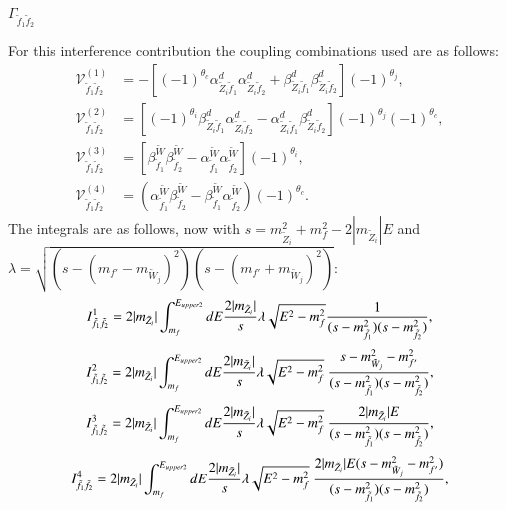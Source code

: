 \documentclass[final,3p,times,pdflatex]{elsarticle}
\begin{document}
\textbf{\underline{$\Gamma_{\tilde{f}_1 \tilde{f}_2}$}}

For this interference contribution the coupling combinations used are as follows:
\begin{align}
\mathcal{V}_{\tilde{f}_1 \tilde{f}_2}^{(1)} &= -[(-1)^{\theta_c}\alpha_{\tilde{Z}_i \tilde{f}_1}^{d}\alpha_{\tilde{Z}_i \tilde{f}_2}^{d} + \beta_{\tilde{Z}_i \tilde{f}_1}^{d} \beta_{\tilde{Z}_i \tilde{f}_2}^{d}](-1)^{\theta_j}, \\
\mathcal{V}_{\tilde{f}_1 \tilde{f}_2}^{(2)} &= [(-1)^{\theta_i}\beta_{\tilde{Z}_i \tilde{f}_1}^{d} \alpha_{\tilde{Z}_i \tilde{f}_2}^{d} - \alpha_{\tilde{Z}_i \tilde{f}_1}^{d} \beta_{\tilde{Z}_i \tilde{f}_2}^{d}](-1)^{\theta_j}(-1)^{\theta_c}, \\
\mathcal{V}_{\tilde{f}_1 \tilde{f}_2}^{(3)} &= [\beta_{\tilde{f}_1}^{\tilde{W}} \beta_{\tilde{f}_2}^{\tilde{W}} - \alpha_{\tilde{f}_1}^{\tilde{W}} \alpha_{\tilde{f}_2}^{\tilde{W}}](-1)^{\theta_i}, \\
\mathcal{V}_{\tilde{f}_1 \tilde{f}_2}^{(4)} &= (\alpha_{\tilde{f}_1}^{\tilde{W}}\beta_{\tilde{f}_2}^{\tilde{W}} - \beta_{\tilde{f}_1}^{\tilde{W}} \alpha_{\tilde{f}_2}^{\tilde{W}})(-1)^{\theta_c}.
\end{align}
The integrals are as follows, now with $s = m_{\tilde{Z}_i}^2 + m_{f}^2 - 2|m_{\tilde{Z}_i}|E$ and $\lambda = \sqrt{(s - (m_{f'}-m_{\tilde{W}_j})^2)(s - (m_{f'}+m_{\tilde{W}_j})^2)}$:
\begin{equation}
I_{\tilde{f}_1 \tilde{f}_2}^{1} = 2|m_{\tilde{Z}_i}| \int_{m_{f}}^{E_{upper2}} dE {2|m_{\tilde{Z}_i}| \over s} \lambda \sqrt{E^2 - m_{f}^2} {1 \over (s-m_{\tilde{f}_1}^2)(s-m_{\tilde{f}_2}^2)},
\end{equation}
\begin{equation}
I_{\tilde{f}_1 \tilde{f}_2}^{2} = 2|m_{\tilde{Z}_i}| \int_{m_{f}}^{E_{upper2}} dE {2|m_{\tilde{Z}_i}| \over s} \lambda \sqrt{E^2 - m_{f}^2} \ {s- m_{\tilde{W}_j}^2 - m_{f'}^2 \over (s-m_{\tilde{f}_1}^2)(s-m_{\tilde{f}_2}^2)},
\end{equation}
\begin{equation}
I_{\tilde{f}_1 \tilde{f}_2}^{3} = 2|m_{\tilde{Z}_i}| \int_{m_{f}}^{E_{upper2}} dE {2|m_{\tilde{Z}_i}| \over s} \lambda \sqrt{E^2 - m_{f}^2} \ {2|m_{\tilde{Z}_i}| E \over (s-m_{\tilde{f}_1}^2)(s-m_{\tilde{f}_2}^2)},
\end{equation}
\begin{equation}
I_{\tilde{f}_1 \tilde{f}_2}^{4} = 2|m_{\tilde{Z}_i}| \int_{m_{f}}^{E_{upper2}} dE {2|m_{\tilde{Z}_i}| \over s} \lambda \sqrt{E^2 - m_{f}^2} \ {2|m_{\tilde{Z}_i}| E (s- m_{\tilde{W}_j}^2 - m_{f'}^2) \over (s-m_{\tilde{f}_1}^2)(s-m_{\tilde{f}_2}^2)},
\end{equation}
\end{document}
